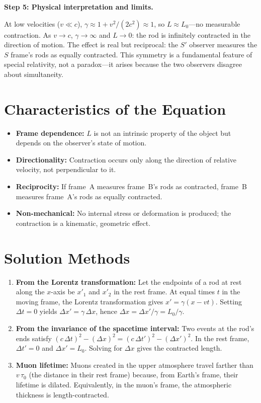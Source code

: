 \textbf{Step 5: Physical interpretation and limits.}

At low velocities ($v \ll c$), $\gamma \approx 1 + v^2/(2c^2) \approx 1$, so $L \approx L_0$---no measurable contraction. As $v \to c$, $\gamma \to \infty$ and $L \to 0$: the rod is infinitely contracted in the direction of motion. The effect is real but reciprocal: the $S'$ observer measures the $S$ frame's rods as equally contracted. This symmetry is a fundamental feature of special relativity, not a paradox---it arises because the two observers disagree about simultaneity.

\section*{Characteristics of the Equation}

\begin{itemize}
  \item \textbf{Frame dependence:} $L$ is not an intrinsic property of the object but depends on the observer's state of motion.
  \item \textbf{Directionality:} Contraction occurs only along the direction of relative velocity, not perpendicular to it.
  \item \textbf{Reciprocity:} If frame~A measures frame~B's rods as contracted, frame~B measures frame~A's rods as equally contracted.
  \item \textbf{Non-mechanical:} No internal stress or deformation is produced; the contraction is a kinematic, geometric effect.
\end{itemize}
\section*{Solution Methods}

\begin{enumerate}
  \item \textbf{From the Lorentz transformation:} Let the endpoints of a rod at rest along the $x$-axis be $x'_{1}$ and $x'_{2}$ in the rest frame. At equal times $t$ in the moving frame, the Lorentz transformation gives $x' = \gamma(x - vt)$. Setting $\Delta t = 0$ yields $\Delta x' = \gamma\,\Delta x$, hence $\Delta x = \Delta x'/\gamma = L_{0}/\gamma$.
  \item \textbf{From the invariance of the spacetime interval:} Two events at the rod's ends satisfy $(c\,\Delta t)^{2} - (\Delta x)^{2} = (c\,\Delta t')^{2} - (\Delta x')^{2}$. In the rest frame, $\Delta t' = 0$ and $\Delta x' = L_{0}$. Solving for $\Delta x$ gives the contracted length.
  \item \textbf{Muon lifetime:} Muons created in the upper atmosphere travel farther than $v\,\tau_{0}$ (the distance in their rest frame) because, from Earth's frame, their lifetime is dilated. Equivalently, in the muon's frame, the atmospheric thickness is length-contracted.
\end{enumerate}
